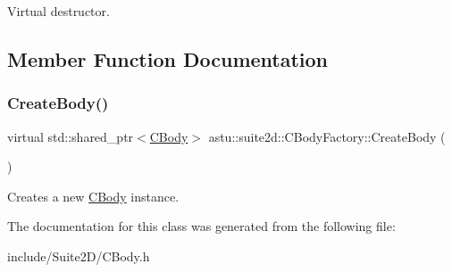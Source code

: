 Virtual destructor. 

\subsection{Member Function Documentation}
\mbox{\label{classastu_1_1suite2d_1_1CBodyFactory_a01cc829fc9c60f772f0621b2a8e88183}} 
\subsubsection{\texorpdfstring{Create\+Body()}{CreateBody()}}
{\footnotesize\ttfamily virtual std\+::shared\+\_\+ptr$<$\hyperlink{classastu_1_1suite2d_1_1CBody}{C\+Body}$>$ astu\+::suite2d\+::\+C\+Body\+Factory\+::\+Create\+Body (\begin{DoxyParamCaption}{ }\end{DoxyParamCaption})\hspace{0.3cm}{\ttfamily [pure virtual]}}

Creates a new \hyperlink{classastu_1_1suite2d_1_1CBody}{C\+Body} instance. 

The documentation for this class was generated from the following file\+:\begin{DoxyCompactItemize}
\item 
include/\+Suite2\+D/C\+Body.\+h\end{DoxyCompactItemize}
